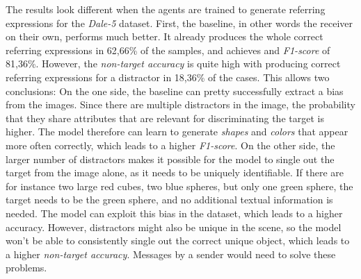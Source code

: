 The results look different when the agents are trained to generate referring expressions for the \emph{Dale-5} dataset.
First, the baseline, in other words the receiver on their own, performs much better.
It already produces the whole correct referring expressions in 62,66\% of the samples, and achieves and \emph{F1-score} of 81,36\%.
However, the \emph{non-target accuracy} is quite high with producing correct referring expressions for a distractor in 18,36\% of the cases.
This allows two conclusions: On the one side, the baseline can pretty successfully extract a bias from the images.
Since there are multiple distractors in the image, the probability that they share attributes that are relevant for discriminating the target is higher.
The model therefore can learn to generate \emph{shapes} and \emph{colors} that appear more often correctly, which leads to a higher \emph{F1-score}.
On the other side, the larger number of distractors makes it possible for the model to single out the target from the image alone, as it needs to be uniquely identifiable.
If there are for instance two large red cubes, two blue spheres, but only one green sphere, the target needs to be the green sphere, and no additional textual information is needed.
The model can exploit this bias in the dataset, which leads to a higher accuracy.
However, distractors might also be unique in the scene, so the model won't be able to consistently single out the correct unique object, which leads to a higher \emph{non-target accuracy}.
Messages by a sender would need to solve these problems.

